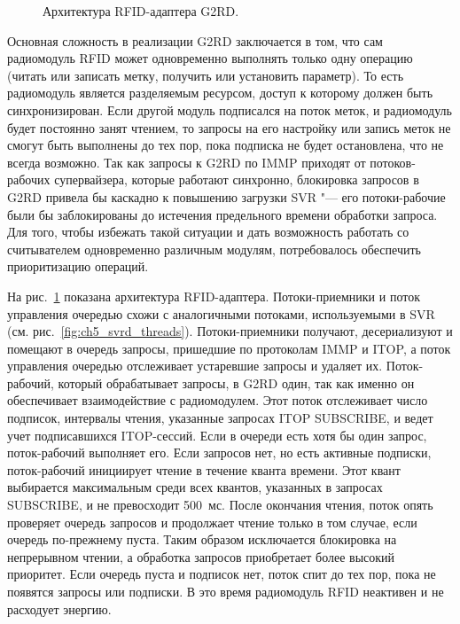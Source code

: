 \begin{figure}[ht]
  \caption{Архитектура RFID-адаптера G2RD.}
  \label{fig:ch5_g2rd_threads}
\end{figure}


Основная сложность в реализации G2RD заключается в том, что сам радиомодуль RFID может одновременно выполнять только одну операцию (читать или записать метку, получить или установить параметр). То есть радиомодуль является разделяемым ресурсом, доступ к которому должен быть синхронизирован. Если другой модуль подписался на поток меток, и радиомодуль будет постоянно занят чтением, то запросы на его настройку или запись меток не смогут быть выполнены до тех пор, пока подписка не будет остановлена, что не всегда возможно. Так как запросы к G2RD по IMMP приходят от потоков-рабочих супервайзера, которые работают синхронно, блокировка запросов в G2RD привела бы каскадно к повышению загрузки SVR "--- его потоки-рабочие были бы заблокированы до истечения предельного времени обработки запроса. Для того, чтобы избежать такой ситуации и дать возможность работать со считывателем одновременно различным модулям, потребовалось обеспечить приоритизацию операций.

На рис.~\ref{fig:ch5_g2rd_threads} показана архитектура RFID-адаптера. Потоки-приемники и поток управления очередью схожи с аналогичными потоками, используемыми в SVR (см. рис.~\ref{fig:ch5_svrd_threads}). Потоки-приемники получают, десериализуют и помещают в очередь запросы, пришедшие по протоколам IMMP и ITOP, а поток управления очередью отслеживает устаревшие запросы и удаляет их. Поток-рабочий, который обрабатывает запросы, в G2RD один, так как именно он обеспечивает взаимодействие с радиомодулем. Этот поток отслеживает число подписок, интервалы чтения, указанные запросах ITOP SUBSCRIBE, и ведет учет подписавшихся ITOP-сессий. Если в очереди есть хотя бы один запрос, поток-рабочий выполняет его. Если запросов нет, но есть активные подписки, поток-рабочий инициирует чтение в течение кванта времени. Этот квант выбирается максимальным среди всех квантов, указанных в запросах SUBSCRIBE, и не превосходит 500~мс. После окончания чтения, поток опять проверяет очередь запросов и продолжает чтение только в том случае, если очередь по-прежнему пуста. Таким образом исключается блокировка на непрерывном чтении, а обработка запросов приобретает более высокий приоритет. Если очередь пуста и подписок нет, поток спит до тех пор, пока не появятся запросы или подписки. В это время радиомодуль RFID неактивен и не расходует энергию.


